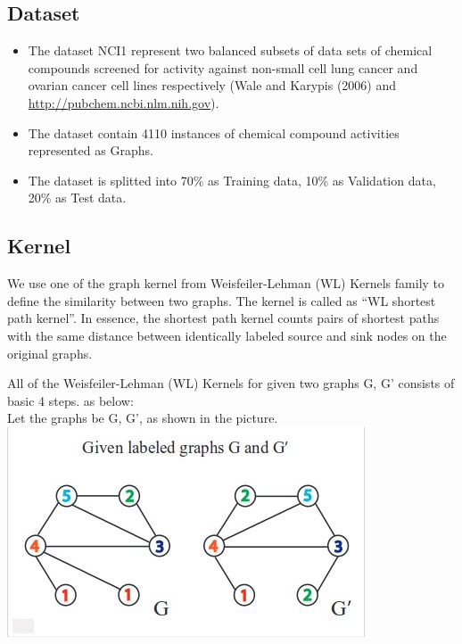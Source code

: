 \documentclass[fleqn]{article}
\begin{document}
\subsection{Dataset}

\begin{itemize}
  \item The dataset NCI1 represent two balanced subsets of data sets of chemical compounds screened 
for activity against non-small cell lung cancer and ovarian cancer cell lines respectively
(Wale and Karypis (2006) and \url{http://pubchem.ncbi.nlm.nih.gov}). 
  \item The dataset contain 4110 instances of chemical compound activities represented as Graphs.
  \item The dataset is splitted into 70\% as Training data, 10\% as Validation data, 20\% as Test data.
\end{itemize}

\subsection{Kernel}
We use one of the graph kernel from Weisfeiler-Lehman (WL) Kernels family to define the similarity
between two graphs. The kernel is called as ``WL shortest path kernel''. In essence, the shortest 
path kernel counts pairs of shortest paths with the same distance between identically labeled 
source and sink nodes on the original graphs.

All of the Weisfeiler-Lehman (WL) Kernels for given two graphs G, G' consists of basic 4 steps. as below:\\

Let the graphs be G, G', as shown in the picture.\\
\includegraphics[scale=0.4]{./pics/twographs.jpg}
\end{document}
